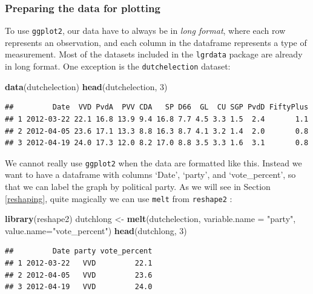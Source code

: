 \documentclass[]{book}
\newenvironment{Shaded}{\begin{snugshade}}{\end{snugshade}}
\newcommand{\DataTypeTok}[1]{\textcolor[rgb]{0.13,0.29,0.53}{#1}}
\newcommand{\DecValTok}[1]{\textcolor[rgb]{0.00,0.00,0.81}{#1}}
\newcommand{\KeywordTok}[1]{\textcolor[rgb]{0.13,0.29,0.53}{\textbf{#1}}}
\newcommand{\NormalTok}[1]{#1}
\newcommand{\StringTok}[1]{\textcolor[rgb]{0.31,0.60,0.02}{#1}}
\begin{document}
\hypertarget{preparing-the-data-for-plotting}{%
\subsubsection{Preparing the data for plotting}\label{preparing-the-data-for-plotting}}

To use \texttt{ggplot2}, our data have to always be in \emph{long format}, where each row represents an observation, and each column in the dataframe represents a type of measurement. Most of the datasets included in the \texttt{lgrdata} package are already in long format. One exception is the \texttt{dutchelection} dataset:

\begin{Shaded}
\begin{Highlighting}[]
\KeywordTok{data}\NormalTok{(dutchelection)}
\KeywordTok{head}\NormalTok{(dutchelection, }\DecValTok{3}\NormalTok{)}
\end{Highlighting}
\end{Shaded}

\begin{verbatim}
##         Date  VVD PvdA  PVV CDA   SP D66  GL  CU SGP PvdD FiftyPlus
## 1 2012-03-22 22.1 16.8 13.9 9.4 16.8 7.7 4.5 3.3 1.5  2.4       1.1
## 2 2012-04-05 23.6 17.1 13.3 8.8 16.3 8.7 4.1 3.2 1.4  2.0       0.8
## 3 2012-04-19 24.0 17.3 12.0 8.2 17.0 8.8 3.5 3.3 1.6  3.1       0.8
\end{verbatim}

We cannot really use \texttt{ggplot2} when the data are formatted like this. Instead we want to have a dataframe with columns `Date', `party', and `vote\_percent', so that we can label the graph by political party. As we will see in Section \ref{reshaping}, quite magically we can use \texttt{melt} from \texttt{reshape2} :

\begin{Shaded}
\begin{Highlighting}[]
\KeywordTok{library}\NormalTok{(reshape2)}
\NormalTok{dutchlong <-}\StringTok{ }\KeywordTok{melt}\NormalTok{(dutchelection, }\DataTypeTok{variable.name =} \StringTok{"party"}\NormalTok{, }\DataTypeTok{value.name=}\StringTok{"vote_percent"}\NormalTok{)}
\KeywordTok{head}\NormalTok{(dutchlong, }\DecValTok{3}\NormalTok{)}
\end{Highlighting}
\end{Shaded}

\begin{verbatim}
##         Date party vote_percent
## 1 2012-03-22   VVD         22.1
## 2 2012-04-05   VVD         23.6
## 3 2012-04-19   VVD         24.0
\end{verbatim}
\end{document}
